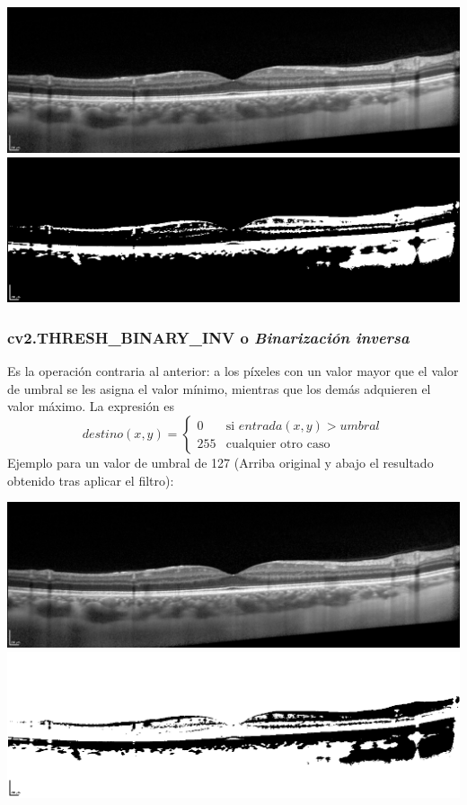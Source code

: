 \includegraphics[scale=0.40]{imagenes/EjemploTecnicasThresholdOriginal.png}\\
\includegraphics[scale=0.40]{imagenes/EjemploTecnicasThresholdBinary_127.png}

\subsubsection{cv2.THRESH\_BINARY\_INV o \emph{Binarización inversa}}
Es la operación contraria al anterior: a los píxeles con un valor
mayor que el valor de umbral se les asigna el valor mínimo, mientras
que los demás adquieren el valor máximo. La expresión es
\begin{equation*}
  destino(x, y) =
  \begin{cases}
    0 & \text{si } entrada(x, y) > umbral \\
    255 & \text{cualquier otro caso}
  \end{cases}
\end{equation*}
Ejemplo para un valor de umbral de 127 (Arriba original y abajo el
resultado obtenido tras aplicar el filtro):

\includegraphics[scale=0.40]{imagenes/EjemploTecnicasThresholdOriginal.png}\\
\includegraphics[scale=0.40]{imagenes/EjemploTecnicasThresholdBinaryInv_127.png}


